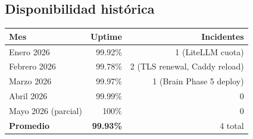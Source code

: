 \documentclass[11pt,a4paper]{article}
\begin{document}
\subsection{Disponibilidad histórica}

\begin{center}
\begin{tabular}{|l|r|r|}
\hline
\rowcolor{sotared}\color{white}\textbf{Mes} & \color{white}\textbf{Uptime} & \color{white}\textbf{Incidentes}\\
\hline
Enero 2026 & 99.92\% & 1 (LiteLLM cuota)\\
Febrero 2026 & 99.78\% & 2 (TLS renewal, Caddy reload)\\
Marzo 2026 & 99.97\% & 1 (Brain Phase 5 deploy)\\
Abril 2026 & 99.99\% & 0\\
Mayo 2026 (parcial) & 100\% & 0\\
\hline
\rowcolor{okbg}\textbf{Promedio} & \textbf{99.93\%} & 4 total\\
\hline
\end{tabular}
\end{center}

\vspace{1cm}

\begin{center}
\end{center}
\end{document}
